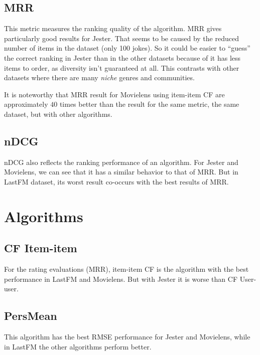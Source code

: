\documentclass[a4paper]{article}
\begin{document}
\subsection{MRR}
This metric measures the ranking quality of the algorithm.
MRR gives particularly good results for Jester. That seems to be caused by the reduced number of items in the dataset (only 100 jokes). So it could be easier to ``guess'' the correct ranking in Jester than in the other datasets because of it has less items to order, as diversity isn't guaranteed at all. This contrasts with other datasets where there are many \textit{niche} genres and communities.

It is noteworthy that MRR result for Movielens using item-item CF are approximately $40$ times better than the result for the same metric, the same dataset, but with other algorithms.



\subsection{nDCG}
nDCG also reflects the ranking performance of an algorithm. For Jester and Movielens, we can see that it has a similar behavior to that of MRR. But in LastFM dataset, its worst result co-occurs with the best results of MRR.

\section{Algorithms}
\subsection{CF Item-item}
For the rating evaluations (MRR), item-item CF is the algorithm with the best performance in LastFM and Movielens. But with Jester it is worse than CF User-user.

\subsection{PersMean}
This algorithm has the best RMSE performance for Jester and Movielens, while in LastFM the other algorithms perform better.
\end{document}

